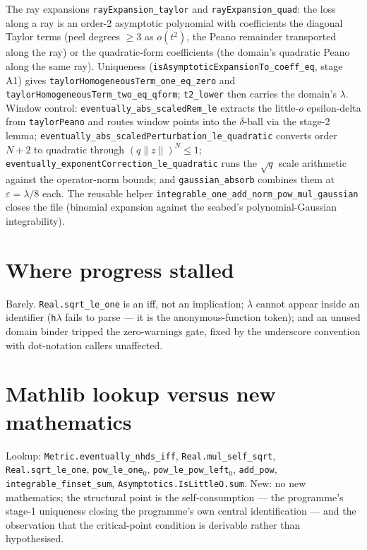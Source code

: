 \documentclass[11pt]{article}
\newcommand{\code}[1]{\texttt{#1}}
\begin{document}
\begin{sloppypar}
The ray expansions \code{rayExpansion\_taylor} and
\code{rayExpansion\_quad}: the loss along a ray is an order-2
asymptotic polynomial with coefficients the diagonal Taylor terms
(peel degrees $\ge 3$ as $o(t^2)$, the Peano remainder transported
along the ray) or the quadratic-form coefficients (the domain's
quadratic Peano along the same ray). Uniqueness
(\code{isAsymptoticExpansionTo\_coeff\_eq}, stage A1) gives
\code{taylorHomogeneousTerm\_one\_eq\_zero} and
\code{taylorHomogeneousTerm\_two\_eq\_qform}; \code{t2\_lower} then
carries the domain's $\lambda$. Window control:
\code{eventually\_abs\_scaledRem\_le} extracts the little-$o$
epsilon-delta from \code{taylorPeano} and routes window points into
the $\delta$-ball via the stage-2 lemma;
\code{eventually\_abs\_scaledPerturbation\_le\_quadratic} converts
order $N{+}2$ to quadratic through $(q\|z\|)^N \le 1$;
\code{eventually\_exponentCorrection\_le\_quadratic} runs the
$\sqrt q$ scale arithmetic against the operator-norm bounds; and
\code{gaussian\_absorb} combines them at $\varepsilon = \lambda/8$
each. The reusable helper
\code{integrable\_one\_add\_norm\_pow\_mul\_gaussian} closes the file
(binomial expansion against the seabed's polynomial-Gaussian
integrability).
\end{sloppypar}

\section{Where progress stalled}

Barely. \code{Real.sqrt\_le\_one} is an iff, not an implication;
$\lambda$ cannot appear inside an identifier (\code{h}$\lambda$ fails
to parse --- it is the anonymous-function token); and an unused
domain binder tripped the zero-warnings gate, fixed by the underscore
convention with dot-notation callers unaffected.

\section{Mathlib lookup versus new mathematics}

\begin{sloppypar}
Lookup: \code{Metric.eventually\_nhds\_iff},
\code{Real.mul\_self\_sqrt}, \code{Real.sqrt\_le\_one},
\code{pow\_le\_one}$_0$, \code{pow\_le\_pow\_left}$_0$,
\code{add\_pow}, \code{integrable\_finset\_sum},
\code{Asymptotics.IsLittleO.sum}. New: no new mathematics; the
structural point is the self-consumption --- the programme's stage-1
uniqueness closing the programme's own central identification ---
and the observation that the critical-point condition is derivable
rather than hypothesised.
\end{sloppypar}
\end{document}
